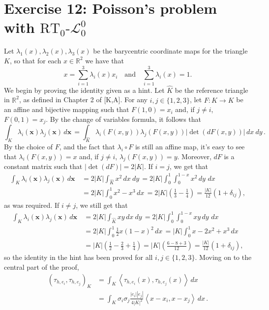 \documentclass[a4paper]{article}
\renewcommand{\vec}[1]{\mathbf{#1}}
\newcommand{\dx}{\, dx \,}
\newcommand{\dy}{\, dy \,}
\newcommand{\dxy}{\, dx \:\! dy \,}
\newcommand{\dvecx}{\, d\vec{x} \,}
\newcommand{\area}[1]{\left\lvert #1 \right\rvert}
\newcommand{\abs}[1]{\left\lvert #1 \right\rvert}
\newcommand{\dpair}[1]{\left\langle #1 \right\rangle}
\newcommand{\R}{\mathbb{R}}
\begin{document}
\section*{Exercise 12: Poisson’s problem with $\text{RT}_0\text{-}\mathcal{L}_0^0$}
Let $\lambda_1(x),\lambda_2(x),\lambda_3(x)$ be the barycentric coordinate maps for
the triangle $K$, so that for each $x \in \R^2$ we have that
\[
x = \sum_{i=1}^3 \lambda_i(x) x_i
\quad \text{and} \quad
\sum_{i=1}^3 \lambda_i(x) = 1.
\]
We begin by proving the identity given as a hint.
Let $\hat{K}$ be the reference triangle in $\R^2$,
as defined in Chapter 2 of {\small[K,A]}.
For any $i,j \in \{1,2,3\}$, let $F \colon \hat{K} \to K$ be
an affine and bijective mapping such that
$F(1,0) = x_i$ and, if $j \neq i$, $F(0,1) = x_j$.
By the change of variables formula, it follows that
\[
\int_K \lambda_i(\vec{x}) \lambda_j(\vec{x}) \dvecx
= \int_{\hat{K}} \lambda_i(F(x,y)) \lambda_j(F(x,y)) \abs{\det(dF(x,y))} \dxy.
\]
By the choice of $F$, and the fact that $\lambda_i \circ F$ is still an affine map,
it's easy to see that $\lambda_i(F(x,y)) = x$ and, if $j \neq i$, $\lambda_j(F(x,y)) = y$.
Moreover, $dF$ is a constant matrix such that $\abs{\det(dF)} = 2\area{K}$.
If $i = j$, we get that
\begin{align*}
	\int_K \lambda_i(\vec{x}) \lambda_j(\vec{x}) \dvecx
&	= 2\area{K} \int_{\hat{K}} x^2 \dxy
	= 2\area{K} \int_0^1 \int_0^{1-x} x^2 \dy \dx \\
&	= 2\area{K} \int_0^1 x^2 - x^3 \dx
	= 2\area{K} \left( \frac{1}{3} - \frac{1}{4} \right)
	= \frac{\area{K}}{12} (1+\delta_{ij}),
\end{align*}
as was required. If $i \neq j$, we still get that
\begin{align*}
	\int_K \lambda_i(\vec{x}) \lambda_j(\vec{x}) \dvecx
&	= 2\area{K} \int_{\hat{K}} xy \dxy
	= 2\area{K} \int_0^1 \int_0^{1-x} xy \dy \dx \\
&	= 2\area{K} \int_0^1 \frac{1}{2} x(1-x)^2 \dx
	= \area{K} \int_0^1 x-2x^2+x^3 \dx \\
&	= \area{K} \left( \frac{1}{2} - \frac{2}{3} + \frac{1}{4} \right)
	= \area{K} \left( \frac{6-8+3}{12} \right)
	= \frac{\area{K}}{12} (1+\delta_{ij}),
\end{align*}
so the identity in the hint has been proved for all $i,j \in \{1,2,3\}$.
Moving on to the central part of the proof,
\begin{align*}
	(\tau_{h,e_i},\tau_{h,e_j})_K
&	= \int_K \dpair{\tau_{h,e_i}(x),\tau_{h,e_j}(x)} \dx \\
&	= \int_K \sigma_i \sigma_j \frac{\abs{e_i}\abs{e_j}}{4\area{K}^2} \dpair{x-x_i,x-x_j} \dx.
\end{align*}
\end{document}
